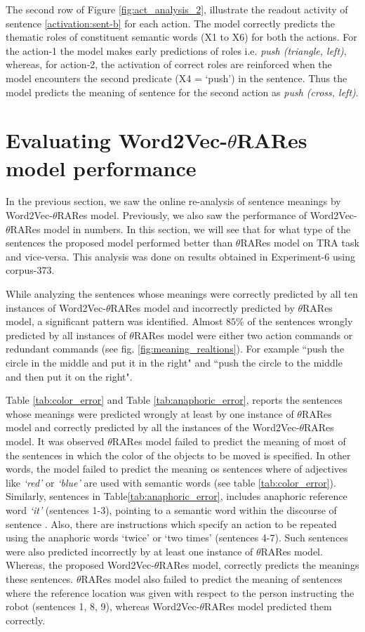 The second row of Figure \ref{fig:act_analysis_2}, illustrate the readout activity of sentence \ref{activation:sent-b} for each action. The model correctly predicts the thematic roles of constituent semantic words (X1 to X6) for both the actions. For the action-1 the model makes early predictions of roles i.e. \textit{push (triangle, left)}, whereas, for action-2, the activation of correct roles are reinforced when the model encounters the second predicate (X4 = `push') in the sentence. Thus the model predicts the meaning of sentence for the second action as \textit{push (cross, left)}.

\section{Evaluating Word2Vec-$\theta$RARes model performance}

In the previous section, we saw the online re-analysis of sentence meanings by Word2Vec-$\theta$RARes model. Previously, we also saw the performance of Word2Vec-$\theta$RARes model in numbers. In this section, we will see that for what type of the sentences the proposed model performed better than $\theta$RARes model on TRA task and vice-versa. This analysis was done on results obtained in Experiment-6 using corpus-373.

While analyzing the sentences whose meanings were correctly predicted by all ten instances of Word2Vec-$\theta$RARes model and incorrectly predicted by $\theta$RARes model, a significant pattern was identified. Almost $85 \%$ of the sentences wrongly predicted by all instances of $\theta$RARes model were either two action commands or redundant commands (see fig. \ref{fig:meaning_realtions}). For example ``push the circle in the middle and put it in the right" and ``push the circle to the middle and then put it on the right".

Table \ref{tab:color_error} and Table \ref{tab:anaphoric_error}, reports the sentences whose meanings were predicted wrongly at least by one instance of $\theta$RARes model and correctly predicted by all the instances of the Word2Vec-$\theta$RARes model. It was observed $\theta$RARes model failed to predict the meaning of most of the sentences in which the color of the objects to be moved is specified. In other words, the model failed to predict the meaning os sentences where of adjectives like \textit{`red'} or \textit{`blue'} are used with semantic words (see table \ref{tab:color_error}).  Similarly, sentences in Table\ref{tab:anaphoric_error}, includes anaphoric reference word \textit{`it'} (sentences 1-3), pointing to a semantic word within the discourse of sentence . Also, there are instructions which specify an action to be repeated using the anaphoric words `twice' or `two times' (sentences 4-7). Such sentences were also predicted incorrectly by at least one instance of $\theta$RARes model. Whereas, the proposed Word2Vec-$\theta$RARes model, correctly predicts the meanings these sentences. $\theta$RARes model also failed to predict the meaning of sentences where the reference location was given with respect to the person instructing the robot (sentences 1, 8, 9), whereas Word2Vec-$\theta$RARes model predicted them correctly. 

